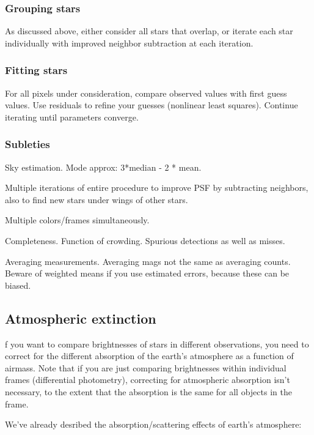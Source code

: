 \documentclass[12pt]{article}
\begin{document}
\subsubsection{Grouping stars}
As discussed above, either consider all stars that overlap, or iterate
each star individually with improved neighbor subtraction at each
iteration.



\subsubsection{Fitting stars}
For all pixels under consideration, compare observed values with first
guess values. Use residuals to refine your guesses (nonlinear least
squares). Continue iterating until parameters converge.



\subsubsection{Subleties}
Sky estimation. Mode approx: 3*median - 2 * mean.

Multiple iterations of entire procedure to improve PSF by subtracting
neighbors, also to find new stars under wings of other stars.

Multiple colors/frames simultaneously.

Completeness. Function of crowding. Spurious detections as well as
misses.

Averaging measurements. Averaging mags not the same as averaging
counts. Beware of weighted means if you use estimated errors, because
these can be biased.


\subsection{Atmospheric extinction}

f you want to compare brightnesses of stars in different observations,
you need to correct for the different absorption of the earth's
atmosphere as a function of airmass. Note that if you are just
comparing brightnesses within individual frames (differential
photometry), correcting for atmospheric absorption isn't necessary, to
the extent that the absorption is the same for all objects in the
frame.

We've already desribed the absorption/scattering effects of earth's
atmosphere:
\end{document}

